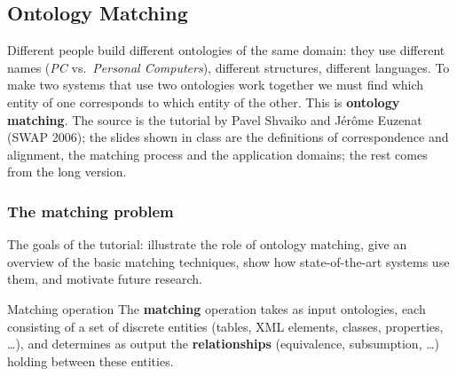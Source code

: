 \subsection{Ontology Matching}
\label{sec:ontology-matching}

Different people build different ontologies of the same domain: they use different
names (\emph{PC} vs.\ \emph{Personal Computers}), different structures, different
languages. To make two systems that use two ontologies work together we must find
which entity of one corresponds to which entity of the other. This is
\textbf{ontology matching}. The source is the tutorial by Pavel Shvaiko and Jérôme
Euzenat (SWAP 2006); the slides shown in class are the definitions of correspondence and
alignment, the matching process and the application domains; the rest comes from the
long version.

\subsubsection{The matching problem}

The goals of the tutorial: illustrate the role of ontology matching, give an overview of
the basic matching techniques, show how state-of-the-art systems use them, and motivate
future research.

\begin{nbdef}{Matching operation}
The \textbf{matching} operation takes as input ontologies, each consisting of a set of
discrete entities (tables, XML elements, classes, properties, \ldots), and determines as
output the \textbf{relationships} (equivalence, subsumption, \ldots) holding between
these entities.
\end{nbdef}

